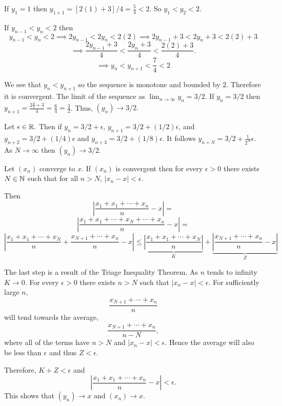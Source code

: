 \documentclass{report}
\begin{document}
\begin{myproof}

  If $y_1 = 1$ then $y_{1+1} =  [2(1) +3]/4 = \frac{5}{4} < 2.$ So $y_1 < y_2 < 2.$
    
  If $y_{n-1}<y_n<2$ then $$y_{n-1}<y_{n}<2 \implies 2y_{n-1}<2y_{n}<2(2)\implies 2y_{n-1} + 3<2y_{n} +3 <2(2) +3  $$
 $$ \implies \frac{2y_{n-1} + 3}{4}<\frac{2y_{n} +3}{4} <\frac{2(2) +3}{4}. $$
 $$ \implies y_{n} <y_{n+1} <\frac{7}{4} < 2$$

 We see that $y_n < y_{n+1}$ so the sequence is monotone and bounded by $2.$  Therefore it is convergent. The limit of the sequence as $
 \lim_{n \rightarrow \infty} y_n = 3/2.$ If $y_n = 3/2$ then $y_{n+1} = \frac{2 \frac{3}{2} +3}{4} = \frac{6}{4}= \frac{3}{2}$. Thus, $(y_n) \rightarrow 3/2.$ 
 \par Let $\epsilon \in \RR.$ Then if $y_n = 3/2 + \epsilon$, $y_{n+1} = 3/2 + (1/2)\epsilon$, and $y_{n+2} = 3/2 + (1/4)\epsilon$ and $y_{n+3} = 3/2 + (1/8)\epsilon$. It follows $y_{n+N} = 3/2 + \frac{1}{2^N} \epsilon.$ As $N \rightarrow \infty$ then $(y_n) \rightarrow 3/2.$

\end{myproof}
\pagebreak

\bigskip
\begin{myproof}
    
  Let $(x_n)$ converge to $x$. If $(x_n)$ is convergent then for every $\epsilon >0$ there exists $N \in \NN$ such that for all $n > N$, $| x_{n} - x| < \epsilon.$

  Then $$ \left| \frac{x_1 + x_1 +\cdots + x_{n} }{n}  - x\right|= $$$$ \left| \frac{x_1 + x_1 + \cdots + x_{N}+ \cdots + x_{n} }{n}  - x\right|= $$
$$ \left| \frac{x_1 + x_1 + \cdots + x_{N}}{n} + \frac{ x_{N+1}+ \cdots + x_{n} }{n} - x\right| \leq \underbrace{\left| \frac{x_1 + x_1 + \cdots + x_{N}}{n} \right|}_{K}+ \underbrace{ \left|\frac{ x_{N + 1}+ \cdots + x_{n} }{n} - x\right|}_{Z}$$

The last step is a result of the Triage Inequality Theorem. As $n$ tends to infinity $K \rightarrow 0.$ For every $\epsilon >0$ there exists $n > N$ such that $| x_{n} - x| < \epsilon.$ For sufficiently large $n$, $$\frac{ x_{N + 1}+ \cdots + x_{n} }{n}$$  will tend towards the average, $$\frac{ x_{N + 1}+ \cdots + x_{n} }{n-N},$$ where all of the terms have $n>N$ and $| x_{n} - x| < \epsilon.$ Hence the average will also be less than $\epsilon$ and thus $Z < \epsilon.$

Therefore, $K + Z <\epsilon$ and
$$ \left| \frac{x_1 + x_1 +\cdots + x_{n} }{n}  - x\right|< \epsilon.$$
This shows that $(y_n) \rightarrow x$ and $(x_n) \rightarrow x.$
\bigskip
\end{myproof}
\end{document}
